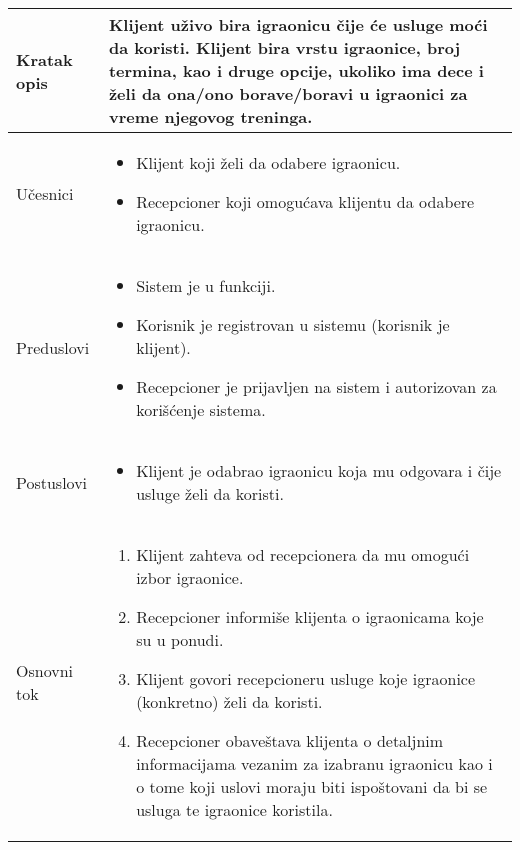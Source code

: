 \documentclass[../../main.tex]{subfiles}
\begin{document}
\begin{longtable}{| p{} | p{} |} 
\hline
    Kratak opis & Klijent uživo bira igraonicu čije će usluge moći da koristi. Klijent bira vrstu igraonice, broj termina, kao i druge opcije, ukoliko ima dece i želi da ona/ono borave/boravi u igraonici za vreme njegovog treninga. \\ 
\hline
    Učesnici &
    \begin{itemize}
        \item Klijent koji želi da odabere igraonicu.
        \item Recepcioner koji omogućava klijentu da odabere igraonicu.
    \end{itemize}\\
\hline
   Preduslovi &
    \begin{itemize}
        \item Sistem je u funkciji.
        \item Korisnik je registrovan u sistemu (korisnik je klijent).
        \item Recepcioner je prijavljen na sistem i autorizovan za korišćenje sistema.
    \end{itemize}\\
\hline  
    Postuslovi & 
    \begin{itemize}
         \item Klijent je odabrao igraonicu koja mu odgovara i čije usluge želi da koristi.
    \end{itemize} \\
\hline
    Osnovni tok & 
    \begin{enumerate}
        \item Klijent zahteva od recepcionera da mu omogući izbor igraonice.
        \item Recepcioner informiše klijenta o igraonicama koje su u ponudi.
        \item Klijent govori recepcioneru usluge koje igraonice (konkretno) želi da koristi.
        \item Recepcioner obaveštava klijenta o detaljnim informacijama vezanim za izabranu igraonicu kao i o tome koji uslovi moraju biti ispoštovani da bi se usluga te igraonice koristila.

\end{enumerate}
\end{longtable}
\end{document}
